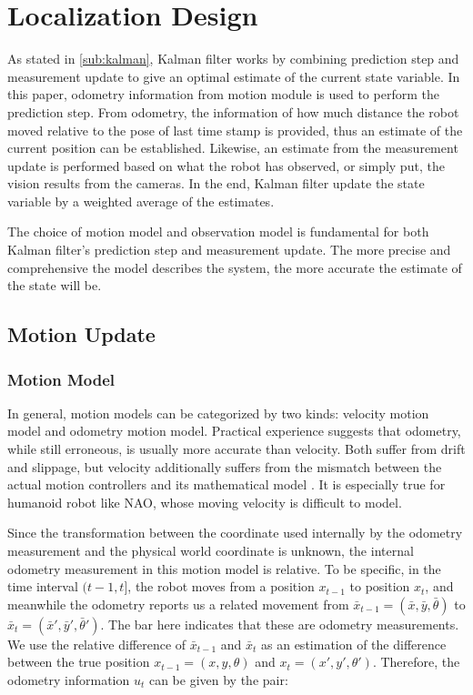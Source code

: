 \chapter{Localization Design\label{cha:chapter4}}


As stated in \autoref{sub:kalman}, Kalman filter works by combining prediction step and measurement update to give an optimal estimate of the current state variable. In this paper, odometry information from motion module is used to perform the prediction step. From odometry, the information of how much distance the robot moved relative to the pose of last time stamp is provided, thus an estimate of the current position can be established. Likewise, an estimate from the measurement update is performed based on what the robot has observed, or simply put, the vision results from the cameras. In the end, Kalman filter update the state variable by a weighted average of the estimates.

The choice of motion model and observation model is fundamental for both Kalman filter's prediction step and measurement update. The more precise and comprehensive the model describes the system, the more accurate the estimate of the state will be. 

\section{Motion Update}\label{sec:Motion Update}
\subsection{Motion Model}\label{sub:Motion Model}
In general, motion models can be categorized by two kinds: velocity motion model and odometry motion model. Practical experience suggests that odometry, while still erroneous, is usually more accurate than velocity. Both suffer from drift and slippage, but velocity additionally suffers from the mismatch between the actual motion controllers and its mathematical model \cite{thrun2005probabilistic}. It is especially true for humanoid robot like NAO, whose moving velocity is difficult to model. 

Since the transformation between the coordinate used internally by the odometry measurement and the physical world coordinate is unknown, the internal odometry measurement in this motion model is relative. 
To be specific, in the time interval $(t-1, t]$, the robot moves from a position $x_{t-1}$ to position $x_t$, and meanwhile the odometry reports us a related movement from $\bar{x}_{t-1} = (\bar{x}, \bar{y}, \bar{\theta})$ to $\bar{x}_{t} = (\bar{x}', \bar{y}', \bar{\theta}')$. The bar here indicates that these are odometry measurements. We use the relative difference of $\bar{x}_{t-1}$ and $\bar{x}_{t}$ as an estimation of the difference between the true position $x_{t-1} = (x, y, \theta)$ and $x_t = (x', y', \theta')$. Therefore, the odometry information $u_t$ can be given by the pair:

